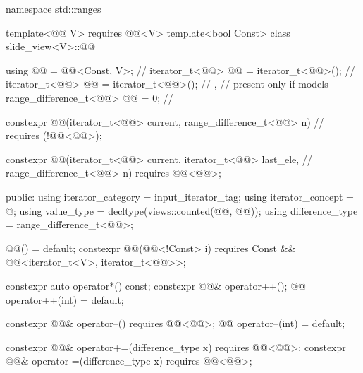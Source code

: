 %
\begin{codeblock}
namespace std::ranges {
  template<@@ V>
    requires @@<V>
  template<bool Const>
  class slide_view<V>::@@ {
    using @@ = @@<Const, V>;                 // \expos
    iterator_t<@@> @@   = iterator_t<@@>();   // \expos
    iterator_t<@@> @@  = iterator_t<@@>();   // \expos,
                                               // present only if  models 
    range_difference_t<@@> @@ = 0;                    // \expos

    constexpr @@(iterator_t<@@> current, range_difference_t<@@> n) // \expos
      requires (!@@<@@>);

    constexpr @@(iterator_t<@@> current, iterator_t<@@> last_ele,  // \expos
                       range_difference_t<@@> n)
      requires @@<@@>;

  public:
    using iterator_category = input_iterator_tag;
    using iterator_concept = @\seebelow@;
    using value_type = decltype(views::counted(@@, @@));
    using difference_type = range_difference_t<@@>;

    @@() = default;
    constexpr @@(@@<!Const> i)
      requires Const && @@<iterator_t<V>, iterator_t<@@>>;

    constexpr auto operator*() const;
    constexpr @@& operator++();
    @@ operator++(int) = default;

    constexpr @@& operator--() requires @@<@@>;
    @@ operator--(int) = default;

    constexpr @@& operator+=(difference_type x)
      requires @@<@@>;
    constexpr @@& operator-=(difference_type x)
      requires @@<@@>;

}}
\end{codeblock}
